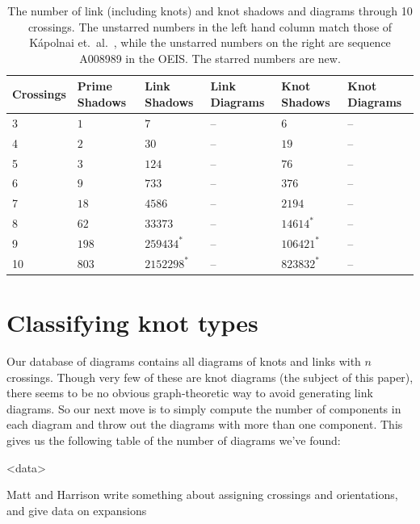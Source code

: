 \documentclass[amsmath,secnumarabic,floatfix,amssymb,nofootinbib,nobibnotes,letterpaper,11pt,tightenlines,showkeys]{revtex4}
\theoremstyle{definition}
\begin{document}
\begin{table}
\begin{ruledtabular}
\begin{tabular}{llllll} 
Crossings & Prime Shadows & Link Shadows & Link Diagrams & Knot Shadows & Knot Diagrams \\ \hline
3  & $\num{1}$   & $\num{7}$           & -- & $\num{6}$       & -- \\
4  & $\num{2}$   & $\num{30}$          & -- & $\num{19}$      & -- \\
5  & $\num{3}$   & $\num{124}$         & -- & $\num{76}$      & -- \\
6  & $\num{9}$   & $\num{733}$         & -- & $\num{376}$     & -- \\
7  & $\num{18}$  & $\num{4586}$        & -- & $\num{2194}$    & -- \\
8  & $\num{62}$  & $\num{33373}$       & -- & $\num{14614}^*$  & -- \\
9  & $\num{198}$ & $\num{259434}^*$    & -- & $\num{106421}^*$ & -- \\
10 & $\num{803}$ & $\num{2152298}^*$   & -- & $\num{823832}^*$ & -- \\ 
\end{tabular}
\end{ruledtabular}
\caption{The number of link (including knots) and knot shadows and diagrams through 10 crossings. The unstarred numbers in the left hand column match those of K\'apolnai et.\ al.~\cite{Kapolnai:2012hs}, while the unstarred numbers on the right are sequence A008989 in the OEIS. The starred numbers are new.}
\end{table}

\section{Classifying knot types}

Our database of diagrams contains all diagrams of knots and links with $n$ crossings. Though very few of these are knot diagrams (the subject of this paper), there seems to be no obvious graph-theoretic way to avoid generating link diagrams. So our next move is to simply compute the number of components in each diagram and throw out the diagrams with more than one component. This gives us the following table of the number of diagrams we've found:

<data>

\begin{center}
Matt and Harrison write something about assigning crossings and orientations, and give data on expansions
\end{center}
\end{document}
